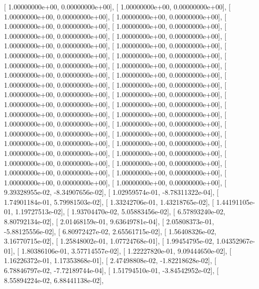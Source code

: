 \documentclass{article}
\begin{document}
       [  1.00000000e+00,   0.00000000e+00],
       [  1.00000000e+00,   0.00000000e+00],
       [  1.00000000e+00,   0.00000000e+00],
       [  1.00000000e+00,   0.00000000e+00],
       [  1.00000000e+00,   0.00000000e+00],
       [  1.00000000e+00,   0.00000000e+00],
       [  1.00000000e+00,   0.00000000e+00],
       [  1.00000000e+00,   0.00000000e+00],
       [  1.00000000e+00,   0.00000000e+00],
       [  1.00000000e+00,   0.00000000e+00],
       [  1.00000000e+00,   0.00000000e+00],
       [  1.00000000e+00,   0.00000000e+00],
       [  1.00000000e+00,   0.00000000e+00],
       [  1.00000000e+00,   0.00000000e+00],
       [  1.00000000e+00,   0.00000000e+00],
       [  1.00000000e+00,   0.00000000e+00],
       [  1.00000000e+00,   0.00000000e+00],
       [  1.00000000e+00,   0.00000000e+00],
       [  1.00000000e+00,   0.00000000e+00],
       [  1.00000000e+00,   0.00000000e+00],
       [  1.00000000e+00,   0.00000000e+00],
       [  1.00000000e+00,   0.00000000e+00],
       [  1.00000000e+00,   0.00000000e+00],
       [  1.00000000e+00,   0.00000000e+00],
       [  1.00000000e+00,   0.00000000e+00],
       [  1.00000000e+00,   0.00000000e+00],
       [  1.00000000e+00,   0.00000000e+00],
       [  1.00000000e+00,   0.00000000e+00],
       [  1.00000000e+00,   0.00000000e+00],
       [  1.00000000e+00,   0.00000000e+00],
       [  1.00000000e+00,   0.00000000e+00],
       [  1.00000000e+00,   0.00000000e+00],
       [  1.00000000e+00,   0.00000000e+00],
       [  1.00000000e+00,   0.00000000e+00],
       [  1.00000000e+00,   0.00000000e+00],
       [  1.00000000e+00,   0.00000000e+00],
       [  1.00000000e+00,   0.00000000e+00],
       [  1.00000000e+00,   0.00000000e+00],
       [  9.39328955e-02,  -8.34907656e-02],
       [  1.02959574e-01,  -8.78311322e-04],
       [  1.74901184e-01,   5.79981503e-02],
       [  1.33242706e-01,   1.43218765e-02],
       [  1.44191105e-01,   1.19727513e-02],
       [  1.93704470e-02,   5.05883456e-02],
       [  6.57893240e-02,   8.80792134e-02],
       [  2.01468159e-01,   9.63649781e-04],
       [  2.05808373e-01,  -5.88125556e-02],
       [  6.80972427e-02,   2.65561715e-02],
       [  1.56408326e-02,   3.16770715e-02],
       [  1.25848002e-01,   1.07724768e-01],
       [  1.99454795e-02,   1.04352967e-01],
       [  1.80386106e-01,   3.57714557e-02],
       [  1.22227820e-01,   9.09444650e-02],
       [  1.16226372e-01,   1.17353868e-01],
       [  2.47498808e-02,  -1.82218628e-02],
       [  6.78846797e-02,  -7.72189744e-04],
       [  1.51794510e-01,  -3.84542952e-02],
       [  8.55894224e-02,   6.88441138e-02],
\end{document}

